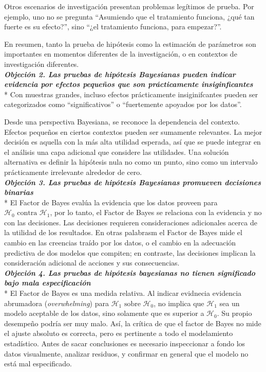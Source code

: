 \documentclass[a4paper,12pt]{article}
\begin{document}
Otros escenarios de investigación presentan problemas legítimos de prueba. Por ejemplo, uno no se pregunta ``Asumiendo que el tratamiento funciona, ¿qué tan fuerte es su efecto?'', sino ``¿el tratamiento funciona, para empezar?''. 


En resumen, tanto la prueba de hipótesis como la estimación de parámetros son importantes en momentos diferentes de la investigación, o en contextos de investigación diferentes.\\

{\slshape\bfseries Objeción 2. Las pruebas de hipótesis Bayesianas pueden indicar evidencia por efectos pequeños que son prácticamente insiginficantes}\\*
Con muestras grandes, incluso efectos prácticamente insiginifcantes pueden ser categorizados como ``significativos'' o ``fuertemente apoyados por los datos''.

Desde una perspectiva Bayesiana, se reconoce la dependencia del contexto. Efectos pequeños en ciertos contextos pueden ser sumamente relevantes. La mejor decisión es aquella con la más alta utilidad esperada, así que se puede integrar en el análisis una capa adicional que considere las utilidades. Una solución alternativa es definir la hipótesis nula no como un punto, sino como un intervalo prácticamente irrelevante alrededor de cero.\\

{\slshape\bfseries Objeción 3. Las pruebas de hipótesis Bayesianas promueven decisiones binarias}\\*
El Factor de Bayes evalúa la evidencia que los datos proveen para $\mathcal H_0 \mbox{ contra } \mathcal H_1$, por lo tanto, el Factor de Bayes se relaciona con la evidencia y no con las decisiones. Las decisiones requieren consideraciones adicionales acerca de la utilidad de los resultados. En otras palabrasm el Factor de Bayes mide el cambio en las creencias traído por los datos, o el cambio en la adecuación predictiva de dos modelos que compiten; en contraste, las decisiones implican la consideración adicional de acciones y sus consecuencias.\\ 

{\slshape\bfseries Objeción 4. Las pruebas de hipótesis bayesianas no tienen significado bajo mala especificación}\\*
El Factor de Bayes es una medida relativa. Al indicar evidnecia evidencia abrumadora ({\slshape overwhelming}) para $\mathcal H_1 \mbox{ sobre } \mathcal H_0$, no implica que $\mathcal H_1$ sea un modelo aceptable de los datos, sino solamente que es superior a $\mathcal H_0$. Su propio desempeño podría ser muy malo. Así, la crítica de que el factor de Bayes no mide el ajuste absoluto es correcta, pero es pertinente a todo el modelamiento estadístico. Antes de sacar conclusiones es necesario inspeccionar a fondo los datos visualmente, analizar residuos, y confirmar en general que el modelo no está mal especificado.\\
\end{document}
